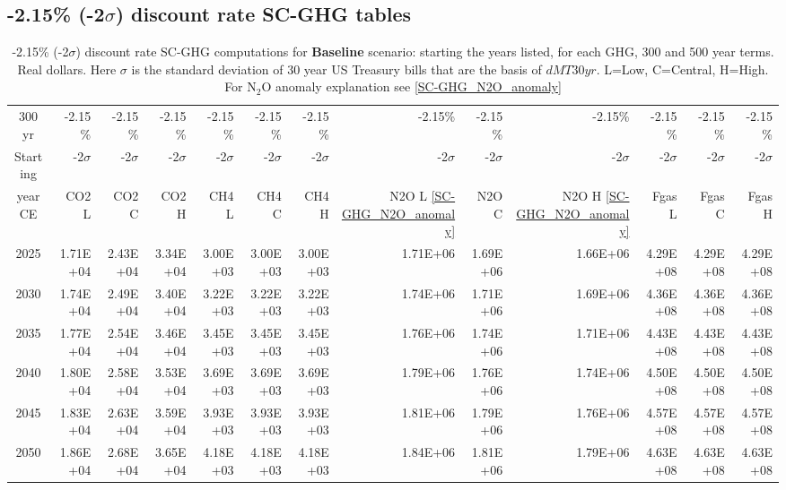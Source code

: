 \documentclass{article}
\begin{document}
\subsection{-2.15\% (-2$\sigma$) discount rate SC-GHG tables}

\begin{table}
   \caption{-2.15\% (-2$\sigma$) discount rate   SC-GHG computations for \textbf{Baseline} scenario: starting the years listed, for each GHG, 300 and 500 year terms. Real dollars. Here $\sigma$ is the standard deviation of 30 year US Treasury bills that are the basis of $dMT30yr$. L=Low, C=Central, H=High. For N$_2$O anomaly explanation see \ref{SC-GHG_N2O_anomaly}} 
\label{PVs_300_yearSCC_B2.15}
\small
\begin{tabular}{crrr|rrr|rrr|rrr}
300 yr   & -2.15\%    & -2.15\%    & -2.15\%    & -2.15\%    & -2.15\%    & -2.15\%    & -2.15\%    & -2.15\%    & -2.15\%    & -2.15\%    & -2.15\%    & -2.15\%    \\
Starting & -2$\sigma$ & -2$\sigma$ & -2$\sigma$ & -2$\sigma$ & -2$\sigma$ & -2$\sigma$ & -2$\sigma$ & -2$\sigma$ & -2$\sigma$ & -2$\sigma$ & -2$\sigma$ & -2$\sigma$ \\
year CE  & CO2 L      & CO2 C      & CO2 H      & CH4 L      & CH4 C      & CH4 H      & N2O L \ref{SC-GHG_N2O_anomaly}     & N2O C      & N2O H \ref{SC-GHG_N2O_anomaly}      & Fgas L     & Fgas C     & Fgas H     \\
2025     & 1.71E+04   & 2.43E+04   & 3.34E+04   & 3.00E+03   & 3.00E+03   & 3.00E+03   & 1.71E+06   & 1.69E+06   & 1.66E+06   & 4.29E+08   & 4.29E+08   & 4.29E+08   \\
2030     & 1.74E+04   & 2.49E+04   & 3.40E+04   & 3.22E+03   & 3.22E+03   & 3.22E+03   & 1.74E+06   & 1.71E+06   & 1.69E+06   & 4.36E+08   & 4.36E+08   & 4.36E+08   \\
2035     & 1.77E+04   & 2.54E+04   & 3.46E+04   & 3.45E+03   & 3.45E+03   & 3.45E+03   & 1.76E+06   & 1.74E+06   & 1.71E+06   & 4.43E+08   & 4.43E+08   & 4.43E+08   \\
2040     & 1.80E+04   & 2.58E+04   & 3.53E+04   & 3.69E+03   & 3.69E+03   & 3.69E+03   & 1.79E+06   & 1.76E+06   & 1.74E+06   & 4.50E+08   & 4.50E+08   & 4.50E+08   \\
2045     & 1.83E+04   & 2.63E+04   & 3.59E+04   & 3.93E+03   & 3.93E+03   & 3.93E+03   & 1.81E+06   & 1.79E+06   & 1.76E+06   & 4.57E+08   & 4.57E+08   & 4.57E+08   \\
2050     & 1.86E+04   & 2.68E+04   & 3.65E+04   & 4.18E+03   & 4.18E+03   & 4.18E+03   & 1.84E+06   & 1.81E+06   & 1.79E+06   & 4.63E+08   & 4.63E+08   & 4.63E+08   \\

\end{tabular}
\end{table}
\end{document}
